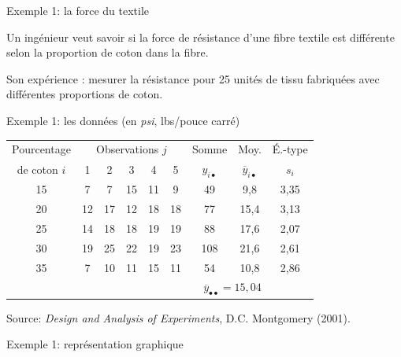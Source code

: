 \documentclass{BeamerTemplate}
\begin{document}
\begin{frame}[t]{Exemple 1:  la force du textile}

Un ingénieur veut savoir si la force de résistance  d'une fibre textile est différente selon la proportion de coton dans la fibre.
\medskip

Son expérience : mesurer la résistance pour 25 unités de tissu fabriquées avec différentes proportions de coton.

\bigskip


\medskip
\end{frame}
\begin{frame}[t]{Exemple 1: les données (en {\it psi}, lbs/pouce carré)}

{\small
\begin{tabular}{c|ccccc|ccc}\hline
Pourcentage & \multicolumn{5}{c|}{Observations $j$} & Somme & Moy.& É.-type\\
de coton $i$ & 1 & 2 & 3 & 4 & 5 & $y_{i\bullet}$ & $\overline{y}_{i\bullet}$ & $s_i$\\ \hline
15 & 7 & 7 & 15 & 11 & 9 & 49 & 9,8 &3,35\\[2mm]
20 & 12 & 17 & 12 & 18 & 18 & 77 & 15,4 &3,13\\[2mm]
25 & 14 & 18 & 18 & 19 & 19 & 88 & 17,6&2,07 \\[2mm]
30 & 19 & 25 & 22 & 19 & 23 & 108 & 21,6&2,61 \\[2mm]
35 & 7 & 10 & 11 & 15 & 11 & 54 & 10,8 &2,86\\ \hline
&&&&&&\multicolumn{2}{r}{$\overline{y}_{\bullet\bullet}=15,04$}
\end{tabular}
}

\vspace{2.7cm}
{\tiny Source: {\it Design and Analysis of Experiments}, D.C. Montgomery (2001).}
\end{frame}

\begin{frame}[t]{Exemple 1: représentation graphique}
\begin{center}
\end{center}
\end{frame}
\end{document}
